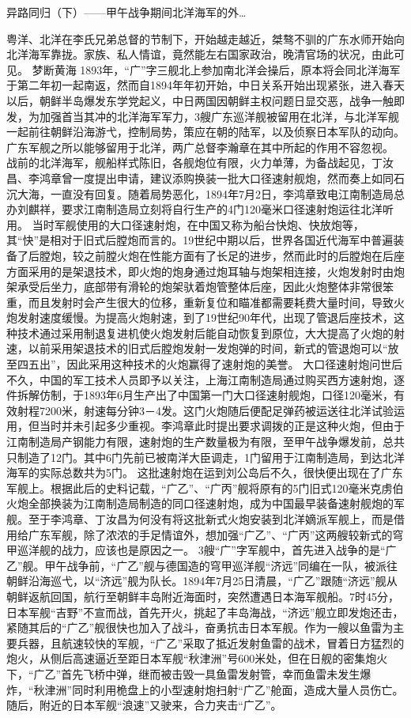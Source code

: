 \documentclass[12pt,UTF8]{ctexbook}
\begin{document}
异路同归（下）——甲午战争期间北洋海军的外…

粤洋、北洋在李氏兄弟总督的节制下，开始越走越近，桀骜不驯的广东水师开始向北洋海军靠拢。家族、私人情谊，竟然能左右国家政治，晚清官场的状况，由此可见。
梦断黄海
1893年，“广”字三舰北上参加南北洋会操后，原本将会同北洋海军于第二年初一起南返，然而自1894年年初开始，中日关系开始出现紧张，进入春天以后，朝鲜半岛爆发东学党起义，中日两国因朝鲜主权问题日显交恶，战争一触即发，为加强首当其冲的北洋海军军力，3艘广东巡洋舰被留用在北洋，与北洋军舰一起前往朝鲜沿海游弋，控制局势，策应在朝的陆军，以及侦察日本军队的动向。广东军舰之所以能够留用于北洋，两广总督李瀚章在其中所起的作用不容忽视。
战前的北洋海军，舰船样式陈旧，各舰炮位有限，火力单薄，为备战起见，丁汝昌、李鸿章曾一度提出申请，建议添购换装一批大口径速射舰炮，然而奏上如同石沉大海，一直没有回复。随着局势恶化，1894年7月2日，李鸿章致电江南制造局总办刘麒祥，要求江南制造局立刻将自行生产的4门120毫米口径速射炮运往北洋听用。
当时军舰使用的大口径速射炮，在中国又称为船台快炮、快放炮等，其“快”是相对于旧式后膛炮而言的。19世纪中期以后，世界各国近代海军中普遍装备了后膛炮，较之前膛火炮在性能方面有了长足的进步，然而此时的后膛炮在后座方面采用的是架退技术，即火炮的炮身通过炮耳轴与炮架相连接，火炮发射时由炮架承受后坐力，底部带有滑轮的炮架驮着炮管整体后座，因此火炮整体非常很笨重，而且发射时会产生很大的位移，重新复位和瞄准都需要耗费大量时间，导致火炮发射速度缓慢。为提高火炮射速，到了19世纪90年代，出现了管退后座技术，这种技术通过采用制退复进机使火炮发射后能自动恢复到原位，大大提高了火炮的射速，以前采用架退技术的旧式后膛炮发射一发炮弹的时间，新式的管退炮可以“放至四五出”，因此采用这种技术的火炮赢得了速射炮的美誉。
大口径速射炮问世后不久，中国的军工技术人员即予以关注，上海江南制造局通过购买西方速射炮，逐件拆解仿制，于1893年6月生产出了中国第一门大口径速射舰炮，口径120毫米，有效射程7200米，射速每分钟3－4发。这门火炮随后便配足弹药被运送往北洋试验运用，但当时并未引起多少重视。李鸿章此时提出要求调拨的正是这种火炮，但由于江南制造局产钢能力有限，速射炮的生产数量极为有限，至甲午战争爆发前，总共只制造了12门。其中6门先前已被南洋大臣调走，1门留用于江南制造局，到达北洋海军的实际总数共为5门。
这批速射炮在运到刘公岛后不久，很快便出现在了广东军舰上。根据此后的史料记载，“广乙”、“广丙”舰将原有的5门旧式120毫米克虏伯火炮全部换装为江南制造局制造的同口径速射炮，成为中国最早装备速射舰炮的军舰。至于李鸿章、丁汝昌为何没有将这批新式火炮安装到北洋嫡派军舰上，而是借用给广东军舰，除了浓浓的手足情谊外，想加强“广乙”、“广丙”这两艘较新式的穹甲巡洋舰的战力，应该也是原因之一。
3艘“广”字军舰中，首先进入战争的是“广乙”舰。甲午战争前，“广乙”舰与德国造的穹甲巡洋舰“济远”同编在一队，被派往朝鲜沿海巡弋，以“济远”舰为队长。1894年7月25日清晨，“广乙”跟随“济远”舰从朝鲜返航回国，航行至朝鲜丰岛附近海面时，突然遭遇日本海军舰船。7时45分，日本军舰“吉野”不宣而战，首先开火，挑起了丰岛海战，“济远”舰立即发炮还击，紧随其后的“广乙”舰很快也加入了战斗，奋勇抗击日本军舰。作为一艘以鱼雷为主要兵器，且航速较快的军舰，“广乙”采取了抵近发射鱼雷的战术，冒着日方猛烈的炮火，从侧后高速逼近至距日本军舰“秋津洲”号600米处，但在日舰的密集炮火下，“广乙”首先飞桥中弹，继而被击毁一具鱼雷发射管，幸而鱼雷未发生爆炸，“秋津洲”同时利用桅盘上的小型速射炮扫射“广乙”舱面，造成大量人员伤亡。随后，附近的日本军舰“浪速”又驶来，合力夹击“广乙”。
\end{document}

